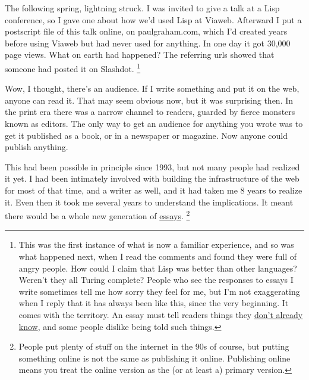 \documentclass[12pt]{book}
\begin{document}
The following spring, lightning struck. I was invited to give a talk at
a Lisp conference, so I gave one about how we'd used Lisp at Viaweb.
Afterward I put a postscript file of this talk online, on
paulgraham.com, which I'd created years before using Viaweb but had
never used for anything. In one day it got 30,000 page views. What on
earth had happened? The referring urls showed that someone had posted it
on Slashdot. \footnote{This was the first instance of what is now a familiar
experience, and so was what happened next, when I read the comments and
found they were full of angry people. How could I claim that Lisp was
better than other languages? Weren't they all Turing complete? People
who see the responses to essays I write sometimes tell me how sorry they
feel for me, but I'm not exaggerating when I reply that it has always
been like this, since the very beginning. It comes with the territory.
An essay must tell readers things they \href{useful.html}{don't already
know}, and some people dislike being told such things.}

Wow, I thought, there's an audience. If I write something and put it on
the web, anyone can read it. That may seem obvious now, but it was
surprising then. In the print era there was a narrow channel to readers,
guarded by fierce monsters known as editors. The only way to get an
audience for anything you wrote was to get it published as a book, or in
a newspaper or magazine. Now anyone could publish anything.

This had been possible in principle since 1993, but not many people had
realized it yet. I had been intimately involved with building the
infrastructure of the web for most of that time, and a writer as well,
and it had taken me 8 years to realize it. Even then it took me several
years to understand the implications. It meant there would be a whole
new generation of \href{essay.html}{essays}. \footnote{People put plenty of stuff on the internet in the 90s of
course, but putting something online is not the same as publishing it
online. Publishing online means you treat the online version as the (or
at least a) primary version.}
\end{document}
